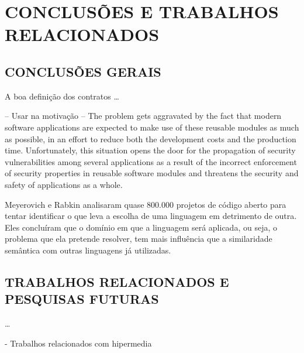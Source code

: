 
\chapter{CONCLUSÕES E TRABALHOS RELACIONADOS}
\vspace{-6mm}


\section{CONCLUSÕES GERAIS}
\vspace{-6mm}

A boa definição dos contratos \ldots 
\vspace{-6mm}


-- Usar na motivação --
The problem gets aggravated by
the fact that modern software applications are expected to
make use of these reusable modules as much as possible,
in an effort to reduce both the development costs and the
production time. Unfortunately, this situation opens the door
for the propagation of security vulnerabilities among several
applications as a result of the incorrect enforcement of security
properties in reusable software modules and threatens the
security and safety of applications as a whole.
\cite{rubio2013verifying}

Meyerovich e Rabkin \cite{meyerovich2013empirical} analisaram quase 800.000
projetos de código aberto para tentar identificar o que leva a escolha de uma
linguagem em detrimento de outra. Eles concluíram que o domínio em que a
linguagem será aplicada, ou seja, o problema que ela pretende resolver, tem mais
influência que a similaridade semântica com outras linguagens já utilizadas. 
\cite{meyerovich2013empirical}





\section{TRABALHOS RELACIONADOS E PESQUISAS FUTURAS }
\vspace{-6mm}

\ldots

- Trabalhos relacionados com hipermedia
